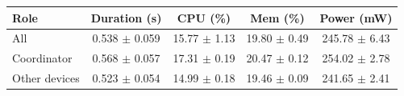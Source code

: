 \begin{tabular}{lcccc}
\hline
\textbf{Role} & \textbf{Duration (s)} & \textbf{CPU (\%)} & \textbf{Mem (\%)} & \textbf{Power (mW)} \\
\hline
All & 0.538 $\pm$ 0.059 & 15.77 $\pm$ 1.13 & 19.80 $\pm$ 0.49 & 245.78 $\pm$ 6.43 \\
Coordinator & 0.568 $\pm$ 0.057 & 17.31 $\pm$ 0.19 & 20.47 $\pm$ 0.12 & 254.02 $\pm$ 2.78 \\
Other devices & 0.523 $\pm$ 0.054 & 14.99 $\pm$ 0.18 & 19.46 $\pm$ 0.09 & 241.65 $\pm$ 2.41 \\
\hline
\end{tabular}

